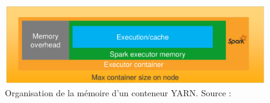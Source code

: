 \begin{figure}[h]
	\centering
	\includegraphics[width=\linewidth]{illustrations/spark-executoronyarn}
	\caption{Organisation de la mémoire d'un conteneur YARN. Source :  \cite{best-practices-emr}}
	\label{fig:spark-executoronyarn}
\end{figure}











